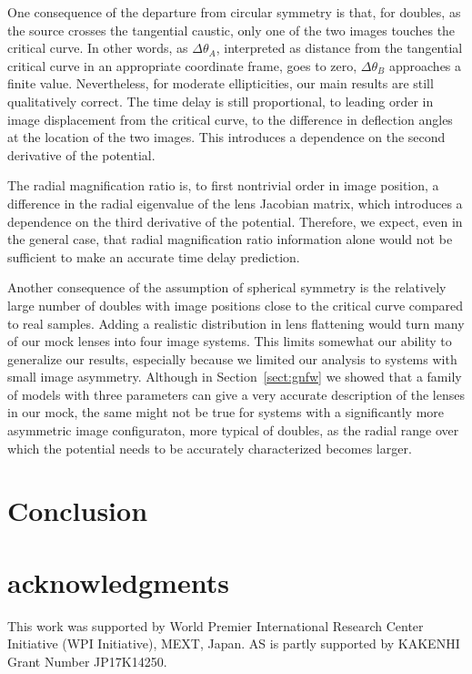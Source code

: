 \documentclass[usenatbib]{mnras}
\def\Sref#1{Section~\ref{#1}\xspace}
\begin{document}
One consequence of the departure from circular symmetry is that, for doubles, as the source crosses the tangential caustic, only one of the two images touches the critical curve.
In other words, as $\Delta\theta_A$, interpreted as distance from the tangential critical curve in an appropriate coordinate frame, goes to zero, $\Delta\theta_B$ approaches a finite value.
Nevertheless, for moderate ellipticities, our main results are still qualitatively correct.
The time delay is still proportional, to leading order in image displacement from the critical curve, to the difference in deflection angles at the location of the two images.
This introduces a dependence on the second derivative of the potential.

The radial magnification ratio is, to first nontrivial order in image position, a difference in the radial eigenvalue of the lens Jacobian matrix, which introduces a dependence on the third derivative of the potential.
Therefore, we expect, even in the general case, that radial magnification ratio information alone would not be sufficient to make an accurate time delay prediction.

Another consequence of the assumption of spherical symmetry is 
 the relatively large number of doubles with image positions close to the critical curve compared to real samples.
Adding a realistic distribution in lens flattening would turn many of our mock lenses into four image systems.
This limits somewhat our ability to generalize our results, especially because we limited our analysis to systems with small image asymmetry.
Although in \Sref{sect:gnfw} we showed that a family of models with three parameters can give a very accurate description of the lenses in our mock, the same might not be true for systems with a significantly more asymmetric image configuraton, more typical of doubles, as the radial range over which the potential needs to be accurately characterized becomes larger.

\section{Conclusion}



\section*{acknowledgments}
This work was supported by World Premier International Research Center Initiative (WPI Initiative), MEXT, Japan.
AS is partly supported by KAKENHI Grant Number JP17K14250. 


\end{document}
